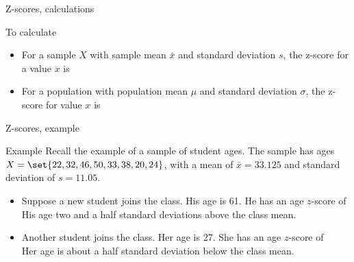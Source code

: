 \documentclass[xcolor=table, aspectratio=169, bigger]{beamer}
\begin{document}
\begin{frame}{Z-scores, calculations}
\begin{block}{To calculate}
\begin{itemize}
\item For a sample $X$ with sample mean $\bar x$ and standard deviation $s$, the z-score for a value $x$ is\\ \smallskip
{}
\smallskip
\pause
\item For a population with population mean $\mu$ and standard deviation $\sigma$, the z-score for value $x$ is\\ \smallskip
{}
\end{itemize} 
\end{block}
\end{frame}

\begin{frame}{Z-scores, example}
\begin{exampleblock}{Example}
Recall the example of a sample of student ages. The sample has ages $X = \set{22, 32, 46, 50, 33, 38, 20, 24}$, with a mean of $\bar x = 33.125$ and standard deviation of $s=11.05$.
\begin{itemize}
\pause
\item Suppose a new student joins the class. His age is 61. He has an age $z$-score of\\ \smallskip
{}
\medskip
\pause
His age two and a half standard deviations above the class mean.
\smallskip
\pause
\item Another student joins the class. Her age is 27. She has an age $z$-score of\\
\smallskip
{}
\medskip
\pause
Her age is about a half standard deviation below the class mean.
\end{itemize}

\end{exampleblock}
\end{frame}
\end{document}
